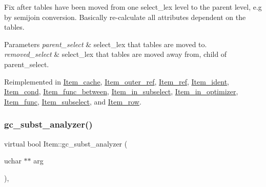 Fix after tables have been moved from one select\+\_\+lex level to the parent level, e.\+g by semijoin conversion. Basically re-\/calculate all attributes dependent on the tables.


\begin{DoxyParams}{Parameters}
{\em parent\+\_\+select} & select\+\_\+lex that tables are moved to. \\
\hline
{\em removed\+\_\+select} & select\+\_\+lex that tables are moved away from, child of parent\+\_\+select. \\
\hline
\end{DoxyParams}


Reimplemented in \mbox{\hyperlink{classItem__cache_a2d1447a09b8702eb448c8176043fe748}{Item\+\_\+cache}}, \mbox{\hyperlink{classItem__outer__ref_a30ff5c4083f8d4d7c6ab5c7b2b4fac0c}{Item\+\_\+outer\+\_\+ref}}, \mbox{\hyperlink{classItem__ref_a54fdde8c2418171d5f529e24d733f357}{Item\+\_\+ref}}, \mbox{\hyperlink{classItem__ident_aef2c77c01832da121180c1a74d3873b5}{Item\+\_\+ident}}, \mbox{\hyperlink{classItem__cond_a8bef49149dce6339066280ef3a43f666}{Item\+\_\+cond}}, \mbox{\hyperlink{classItem__func__between_ade856fd17d40b1e39a2cdde5591423f3}{Item\+\_\+func\+\_\+between}}, \mbox{\hyperlink{classItem__in__subselect_aa6c971974969097521a5a736ea6eed02}{Item\+\_\+in\+\_\+subselect}}, \mbox{\hyperlink{classItem__in__optimizer_aeac1cb56fd617d7cebee1d792b02ba1a}{Item\+\_\+in\+\_\+optimizer}}, \mbox{\hyperlink{classItem__func_ab2b8cc7a3bf580679718da7e99e3e8d9}{Item\+\_\+func}}, \mbox{\hyperlink{classItem__subselect_a8636b93f943b8a52f75222eb4e49c4cf}{Item\+\_\+subselect}}, and \mbox{\hyperlink{classItem__row_a2da513a82afd5830483e351dbc9c2dad}{Item\+\_\+row}}.

\mbox{\label{classItem_aea5d6f41e9cd5d17d8e6e8d44bee9c3e}} 
\subsubsection{\texorpdfstring{gc\+\_\+subst\+\_\+analyzer()}{gc\_subst\_analyzer()}}
{\footnotesize\ttfamily virtual bool Item\+::gc\+\_\+subst\+\_\+analyzer (\begin{DoxyParamCaption}\item[{uchar $\ast$$\ast$}]{arg }\end{DoxyParamCaption})\hspace{0.3cm}{\ttfamily [inline]}, {\ttfamily [virtual]}}

